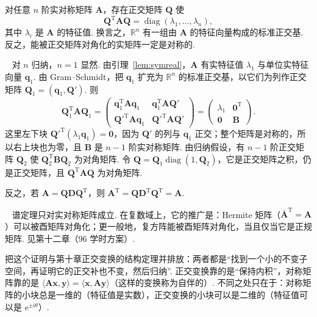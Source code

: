 \documentclass[lang=cn,10.5pt,scheme=chinese,toc=twocol,section,chinesefont=nofont,
twoside,citestyle=gb7714-2015,bibstyle=gb7714-2015]{elegantbook}
\DeclareRobustCommand{\textbf}[1]{{\lnsemiboldlatin\lnsemiboldcjk #1}}
\newcommand{\vv}[1]{\boldsymbol{#1}}
\newcommand{\zero}{\boldsymbol{0}}          %
\newcommand{\trans}{\mathrm{T}}             %
\numberwithin{equation}{section}   %
\newcommand{\diag}{\operatorname{diag}}
\newcommand*{\lnlabel}[1]{{\sffamily\bfseries\color{black}#1}}
\renewenvironment{proof}{%
	\par\noindent\lnlabel{\proofname}\;\ \color{black!90}\cfs}{\par}
\renewenvironment{remark}{\noindent\lnlabel{\remarkname}\ }{\par}
\begin{document}
\begin{theorem}[谱定理]\label{thm:spectral}
  对任意 $n$ 阶实对称矩阵 $\vv A$，存在正交矩阵 $\vv Q$ 使
  \[\vv Q^\trans\vv A\vv Q=\diag(\lambda_1,\ldots,\lambda_n),\]
  其中 $\lambda_i$ 是 $\vv A$ 的特征值. 换言之，$\mathbb{R}^n$ 有一组由 $\vv A$ 的特征向量构成的标准正交基. 反之，能被正交矩阵对角化的实矩阵一定是对称的.
\end{theorem}
\begin{proof}
  对 $n$ 归纳，$n=1$ 显然. 由引理~\ref{lem:symreal}，$\vv A$ 有实特征值 $\lambda_1$ 与单位实特征向量 $\vv q_1$. 由 Gram–Schmidt，把 $\vv q_1$ 扩充为 $\mathbb{R}^n$ 的标准正交基，以它们为列作正交矩阵 $\vv Q_1=(\vv q_1,\vv Q')$. 则
  \[\vv Q_1^\trans\vv A\vv Q_1=
    \begin{pmatrix}
      \vv q_1^\trans\vv A\vv q_1 & \vv q_1^\trans\vv A\vv Q' \\ \vv Q'^\trans\vv A\vv q_1&\vv Q'^\trans\vv A\vv Q'
    \end{pmatrix}
    =
    \begin{pmatrix}
      \lambda_1 & \zero^\trans \\ \zero&\vv B
    \end{pmatrix}
    .\]
  这里左下块 $\vv Q'^\trans(\lambda_1\vv q_1)=\zero$，因为 $\vv Q'$ 的列与 $\vv q_1$ 正交；整个矩阵是对称的，所以右上块也为零，且 $\vv B$ 是 $n-1$ 阶实对称矩阵. 由归纳假设，有 $n-1$ 阶正交矩阵 $\vv Q_2$ 使 $\vv Q_2^\trans\vv B\vv Q_2$ 为对角矩阵. 令 $\vv Q=\vv Q_1\diag(1,\vv Q_2)$，它是正交矩阵之积，仍是正交矩阵，且 $\vv Q^\trans\vv{AQ}$ 为对角矩阵.

  反之，若 $\vv A=\vv Q\vv D\vv Q^\trans$，则 $\vv A^\trans=\vv Q\vv D^\trans\vv Q^\trans=\vv A$.
\end{proof}

\begin{remark}
  谱定理只对实对称矩阵成立. 在复数域上，它的推广是：Hermite 矩阵（$\bar{\vv A}^\trans=\vv A$）可以被酉矩阵对角化；更一般地，复方阵能被酉矩阵对角化，当且仅当它是正规矩阵. 见第十二章（96 学时方案）.%
\end{remark}

\begin{motivebox}
  把这个证明与第十章正交变换的结构定理并排放：两者都是“找到一个小的不变子空间，再证明它的正交补也不变，然后归纳”. 正交变换靠的是“保持内积”，对称矩阵靠的是 $\langle\vv{Ax},\vv y\rangle=\langle\vv x,\vv{Ay}\rangle$（这样的变换称为\textbf{自伴的}）. 不同之处只在于：对称矩阵的小块总是一维的（特征值是实数），正交变换的小块可以是二维的（特征值可以是 $\mathrm e^{\pm\mathrm i\theta}$）.
\end{motivebox}
\end{document}
